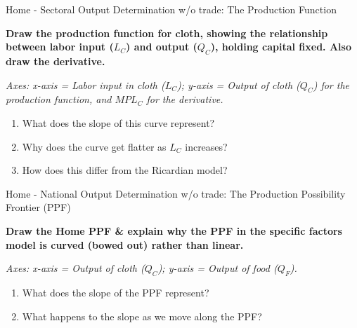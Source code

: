 \documentclass{beamer}
\begin{document}
\begin{frame}{Home - Sectoral Output Determination w/o trade: The Production Function}

\textbf{Draw the production function for cloth, showing the relationship between labor input ($L_C$) and output ($Q_C$), holding capital fixed. Also draw the derivative.}

\vspace{0.2cm}

\textit{Axes: x-axis = Labor input in cloth ($L_C$); y-axis = Output of cloth ($Q_C$) for the production function, and $MPL_C$ for the derivative.}

\vspace{0.3cm}

\begin{enumerate}
    \item What does the slope of this curve represent?
    \item Why does the curve get flatter as $L_C$ increases?
    \item How does this differ from the Ricardian model?
\end{enumerate}

\end{frame}


\begin{frame}{Home - National Output Determination w/o trade: The Production Possibility Frontier (PPF)}

\textbf{Draw the Home PPF \& explain why the PPF in the specific factors model is curved (bowed out) rather than linear.}

\vspace{0.2cm}

\textit{Axes: x-axis = Output of cloth ($Q_C$); y-axis = Output of food ($Q_F$).}

\vspace{0.3cm}

\begin{enumerate}
    \item What does the slope of the PPF represent?
    \item What happens to the slope as we move along the PPF?
\end{enumerate}

\end{frame}

\end{document}
